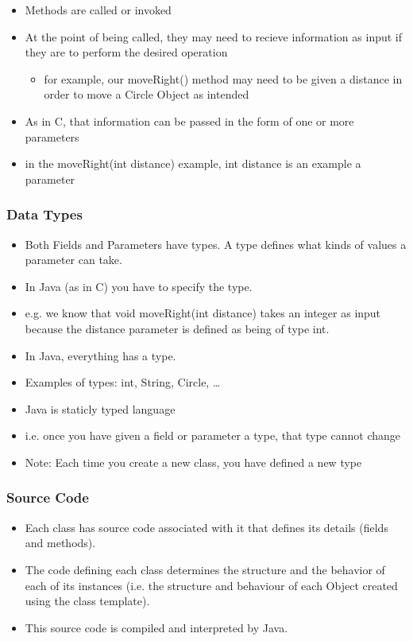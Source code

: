 \documentclass{beamer}
\begin{document}
\begin{frame}
\begin{itemize}
\item Methods are \alert{called} or \alert{invoked}
\item At the point of being called, they may need to recieve information as input if they are to perform the desired operation
\begin{itemize}
\item for example, our moveRight() method may need to be given a distance in order to move a Circle Object as intended
\end{itemize}
\item As in C, that information can be passed in the form of one or more \alert{parameters}
\item in the moveRight(int distance) example, int distance is an example a parameter
\end{itemize}
\end{frame}

\begin{frame}
\frametitle{Data Types}
\begin{itemize}
\item Both Fields and Parameters have \alert{types}. A type defines what kinds of values a parameter can take.
\item In Java (as in C) you have to specify the type.
\item e.g. we know that void moveRight(int distance) takes an integer as input because the distance parameter is defined as being of type int. 
\end{itemize}
\end{frame}

\begin{frame}
\begin{itemize}
\item In Java, everything has a type.
\item Examples of types: int, String, Circle, \ldots
\item Java is \alert{staticly typed language}
\item i.e. once you have given a field or parameter a type, that type cannot change
\item Note: Each time you create a new class, you have defined a new type
\end{itemize}
\end{frame}

\begin{frame}
\frametitle{Source Code}
\begin{itemize}
\item Each class has source code associated with it that defines its details (fields and methods).
\item The code defining each class determines the structure and the behavior of each of its instances (i.e. the structure and behaviour of each Object created using the class template).
\item This source code is compiled and interpreted by Java.
\end{itemize}
\end{frame}
\end{document}
